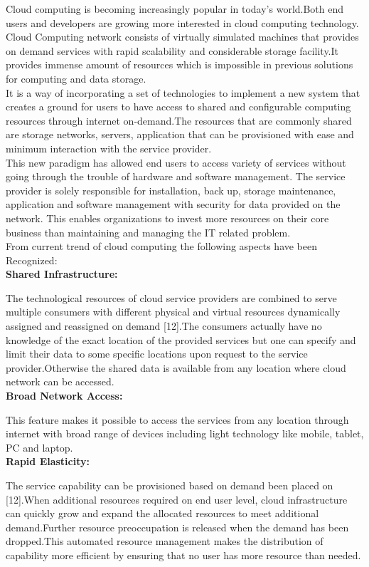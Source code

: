\documentclass {report}
\begin{document}
Cloud computing is becoming increasingly popular in today's world.Both end users and 
developers are growing more interested in cloud computing technology. 
Cloud Computing network consists of virtually simulated machines that provides on demand services with rapid scalability and considerable storage facility.It provides 
immense amount of resources which is impossible in previous solutions for computing 
and data storage.\\
 It is a way of incorporating a set of technologies to 
implement a new system that creates a ground for users to have access to shared 
and configurable computing resources through internet on-demand.The resources that
are commonly shared are storage networks, servers, application that can be provisioned 
with ease and minimum interaction with the service provider.\\
This new paradigm has allowed 
end users to access variety of services without going through the trouble of hardware and 
software management. The service provider is solely responsible for installation, back up,
storage maintenance, application and software management with security for data provided
on the network. This enables organizations to invest more resources on their core business
than maintaining and managing the IT related problem.\\
From current trend of cloud computing the following aspects have been Recognized:\\

{\bfseries Shared Infrastructure:}

The technological resources of cloud service providers are combined to serve multiple
consumers with different physical and virtual resources dynamically assigned and reassigned
on demand [12].The consumers actually have no knowledge of the exact location of the provided 
services but one can specify and limit their data to some specific locations upon request to the 
service provider.Otherwise the shared data is available from any location where cloud network
can be accessed.\\

{\bfseries Broad Network Access:}

This feature makes it possible to access the services from any location through internet
with broad range of devices including light technology like mobile, tablet, PC and laptop.\\

{\bfseries Rapid Elasticity:}

The service capability can be provisioned based on demand been placed on [12].When additional
resources required on end user level, cloud infrastructure can quickly grow and expand the
allocated resources to meet additional demand.Further resource preoccupation is released 
when the demand has been dropped.This automated resource management makes the
distribution of capability more efficient by ensuring that no user has more resource than
needed.\\
\end{document}
